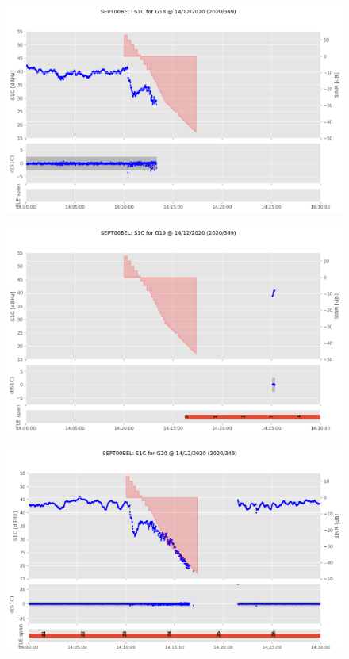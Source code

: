 \begin{enumerate}
\begin{figure}[H]%
\centering%
\includegraphics[width=0.95\linewidth]{png/SEPT00BEL_R_20203491400_30M_01S_MO_G-S1C-G18.png}%
\end{figure}

%


\begin{figure}[H]%
\centering%
\includegraphics[width=0.95\linewidth]{png/SEPT00BEL_R_20203491400_30M_01S_MO_G-S1C-G19.png}%
\end{figure}

%


\begin{figure}[H]%
\centering%
\includegraphics[width=0.95\linewidth]{png/SEPT00BEL_R_20203491400_30M_01S_MO_G-S1C-G20.png}%
\end{figure}


\end{enumerate}
